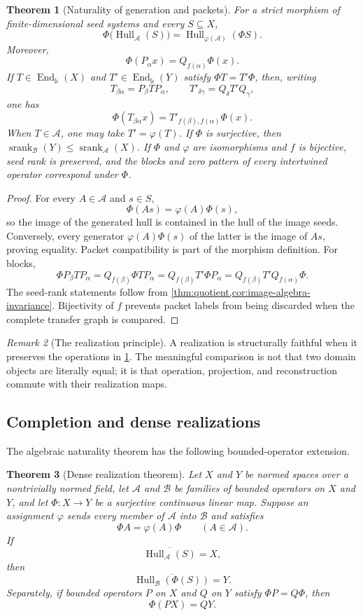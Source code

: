 \documentclass[11pt]{article}
\newtheorem{theorem}{Theorem}[section]
\theoremstyle{definition}
\theoremstyle{remark}
\newtheorem{remark}[theorem]{Remark}
\newcommand{\cA}{\mathcal A}
\newcommand{\cB}{\mathcal B}
\newcommand{\Hull}{\operatorname{Hull}}
\newcommand{\srank}{\operatorname{srank}}
\newcommand{\End}{\operatorname{End}}
\newcommand{\bbk}{\mathbb{k}}
\newcommand{\closure}[1]{\overline{#1}}
\begin{document}
\begin{theorem}[Naturality of generation and packets]
\label{thm:naturality}
For a strict morphism of finite-dimensional seed systems and every $S\subseteq X$,
\[
\Phi\bigl(\Hull_{\cA}(S)\bigr)
=
\Hull_{\varphi(\cA)}(\Phi S).
\]
Moreover,
\[
\Phi(P_{\alpha}x)=Q_{f(\alpha)}\Phi(x).
\]
If $T\in\End_{\bbk}(X)$ and $T'\in\End_{\bbk}(Y)$ satisfy $\Phi T=T'\Phi$, then, writing
\[
T_{\beta\alpha}=P_{\beta}TP_{\alpha},
\qquad
T'_{\delta\gamma}=Q_{\delta}T'Q_{\gamma},
\]
one has
\[
\Phi(T_{\beta\alpha}x)
=
T'_{f(\beta),f(\alpha)}\Phi(x).
\]
When $T\in\cA$, one may take $T'=\varphi(T)$. If $\Phi$ is surjective, then $\srank_{\cB}(Y)\le\srank_{\cA}(X)$. If $\Phi$ and $\varphi$ are isomorphisms and $f$ is bijective, seed rank is preserved, and the blocks and zero pattern of every intertwined operator correspond under $\Phi$.
\end{theorem}

\begin{proof}
For every $A\in\cA$ and $s\in S$,
\[
\Phi(As)=\varphi(A)\Phi(s),
\]
so the image of the generated hull is contained in the hull of the image seeds. Conversely, every generator $\varphi(A)\Phi(s)$ of the latter is the image of $As$, proving equality. Packet compatibility is part of the morphism definition. For blocks,
\[
\Phi P_{\beta}TP_{\alpha}
=Q_{f(\beta)}\Phi TP_{\alpha}
=Q_{f(\beta)}T'\Phi P_{\alpha}
=Q_{f(\beta)}T'Q_{f(\alpha)}\Phi.
\]
The seed-rank statements follow from \cref{thm:quotient,cor:image-algebra-invariance}. Bijectivity of $f$ prevents packet labels from being discarded when the complete transfer graph is compared.
\end{proof}

\begin{remark}[The realization principle]
A realization is structurally faithful when it preserves the operations in \cref{thm:naturality}. The meaningful comparison is not that two domain objects are literally equal; it is that operation, projection, and reconstruction commute with their realization maps.
\end{remark}

\subsection{Completion and dense realizations}

The algebraic naturality theorem has the following bounded-operator extension.

\begin{theorem}[Dense realization theorem]
\label{thm:dense-realization}
Let $X$ and $Y$ be normed spaces over a nontrivially normed field, let $\cA$ and $\cB$ be families of bounded operators on $X$ and $Y$, and let $\Phi:X\to Y$ be a surjective continuous linear map. Suppose an assignment $\varphi$ sends every member of $\cA$ into $\cB$ and satisfies
\[
\Phi A=\varphi(A)\Phi
\qquad(A\in\cA).
\]
If
\[
\closure{\Hull_{\cA}(S)}=X,
\]
then
\[
\boxed{\closure{\Hull_{\cB}(\Phi(S))}=Y.}
\]
Separately, if bounded operators $P$ on $X$ and $Q$ on $Y$ satisfy $\Phi P=Q\Phi$, then
\[
\boxed{\Phi(PX)=QY.}
\]
\end{theorem}
\end{document}
